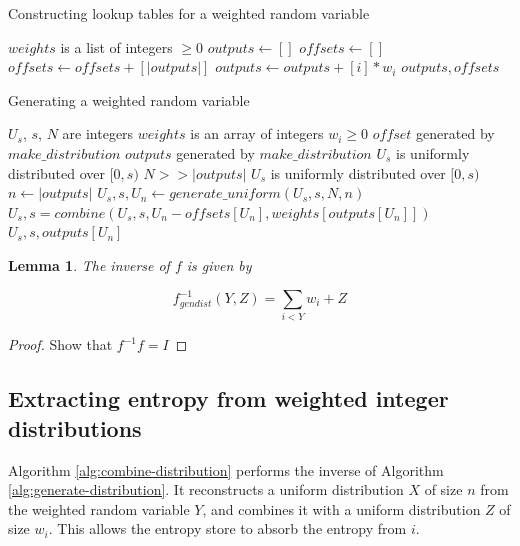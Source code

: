 \documentclass[12pt]{article}
\newtheorem{lemma}{Lemma}
\begin{document}
\begin{algorithm}
\caption{Constructing lookup tables for a weighted random variable}
\label{alg:generate-lookup-tables}
\begin{algorithmic}[1]
\Require $weights$ is a list of integers $\ge0$
  \State $outputs \gets []$
  \State $offsets \gets []$
    \State $offsets \gets offsets + [|outputs|]$
    \State $outputs \gets outputs + [i] * w_i$
  \EndFor
  \State \Return $outputs, offsets$
\EndProcedure
\end{algorithmic}
\end{algorithm}


\begin{algorithm}
\caption{Generating a weighted random variable}
\label{alg:generate-distribution}
\begin{algorithmic}[1]
\Require $U_s$, $s$, $N$ are integers
\Require $weights$ is an array of integers $w_i \ge 0$
\Require $offset$ generated by $make\_distribution$ 
\Require $outputs$ generated by $make\_distribution$
\Require $U_s$ is uniformly distributed over $[0,s)$
\Require $N >> |outputs|$
\Ensure $U_s$ is uniformly distributed over $[0,s)$
    \State $n \gets |outputs|$
    \State $U_s, s, U_n \gets generate\_uniform(U_s, s, N, n)$
    \State $U_s, s = combine(U_s, s, U_n - offsets[U_n], weights[outputs[U_n]])$
    \State \Return $U_s, s, outputs[U_n]$
\EndProcedure
\end{algorithmic}
\end{algorithm}


\begin{lemma}
The inverse of $f$ is given by

    \begin{equation}
    f^{-1}_{gendist}(Y,Z) = \sum_{i<Y}w_i + Z
    \end{equation}
\end{lemma}

\begin{proof}
    Show that $f^{-1}f= I$

\end{proof}

\subsection {Extracting entropy from weighted integer distributions}

Algorithm \ref{alg:combine-distribution} performs the inverse of Algorithm \ref{alg:generate-distribution}. It reconstructs a uniform distribution $X$ of size $n$ from the weighted random variable $Y$, and combines it with a uniform distribution $Z$ of size $w_i$. This allows the entropy store to absorb the entropy from $i$.
\end{document}
